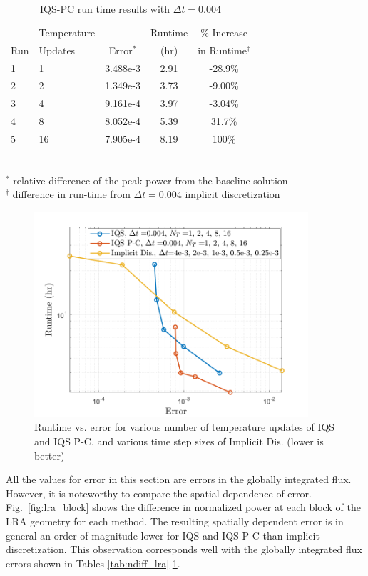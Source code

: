 \documentclass{elsarticle}
\newcommand{\fig}[1]{Fig.~\ref{#1}}                      %
\newcommand{\iqspc}{IQS-PC\xspace}
\begin{document}
\begin{table}[!htbp]
\begin{center}
\caption{\iqspc run time results with $\Delta t = 0.004$}
\label{tab:iqspc_lra}
\begin{tabular}{|l|l|ccc|}
\hline
	&  Temperature 	&  		& Runtime 	& \% Increase	\\
Run	&  Updates 	& Error$^*$ & (hr)		& in Runtime$^{\dagger}$\\
\hline
1	& 1		& 3.488e-3 	& 2.91 	& -28.9\%	\\
2	& 2		& 1.349e-3 	& 3.73	& -9.00\%	\\
\rowcolor{yellow} 3 	& 4 	& 9.161e-4 	& 3.97	& -3.04\%	\\
4 	& 8 	& 8.052e-4 	& 5.39	&  31.7\%	\\
5 	& 16	& 7.905e-4 	& 8.19	&  100\%	\\
\hline
\end{tabular}
\\
\footnotesize{$^*$ relative difference of the peak power from the baseline solution}\\
\footnotesize{$^{\dagger}$ difference in run-time from $\Delta t = 0.004$ implicit discretization} 
\end{center}
\end{table}

\begin{figure}[htbp!]
\centering
\includegraphics[height=3in]{figures/lra_rt_vs_err.png}
\caption{Runtime vs. error for various number of temperature updates of IQS and IQS P-C, and various time step sizes of Implicit Dis. (lower is better)}
\label{fig:lra_rt_vs_err}
\end{figure}

All the values for error in this section are errors in the globally integrated flux. However, it is noteworthy to compare the spatial dependence of error. \fig{fig:lra_block} shows the difference in normalized power at each block of the LRA geometry for each method. The resulting spatially dependent error is in general an order of magnitude lower for IQS and IQS P-C than implicit discretization. This observation corresponds well with the globally integrated flux errors shown in Tables \ref{tab:ndiff_lra}-\ref{tab:iqspc_lra}. 
\end{document}
